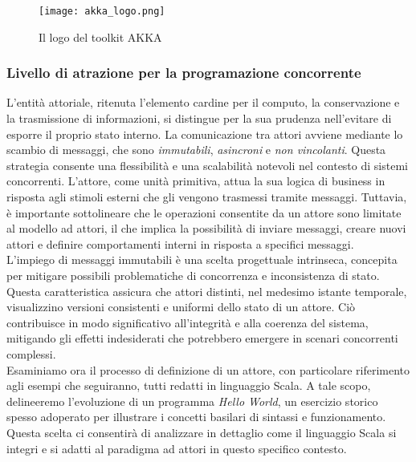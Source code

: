\begin{figure}[!ht]
  \centering
  \texttt{[image: akka\_logo.png]}
  \caption[Logo AKKA]{Il logo del toolkit AKKA \cite{akka}}
\end{figure}

\subsubsection[Programmazione concorrente]{Livello di atrazione per la programazione concorrente}
L'entità attoriale, ritenuta l'elemento cardine per il computo, la conservazione e la trasmissione di informazioni, si distingue per la sua prudenza nell'evitare di esporre il proprio stato interno.
La comunicazione tra attori avviene mediante lo scambio di messaggi, che sono \textit{immutabili}, \textit{asincroni} e \textit{non vincolanti}.
Questa strategia consente una flessibilità e una scalabilità notevoli nel contesto di sistemi concorrenti.
L'attore, come unità primitiva, attua la sua logica di business in risposta agli stimoli esterni che gli vengono trasmessi tramite messaggi.
Tuttavia, è importante sottolineare che le operazioni consentite da un attore sono limitate al modello ad attori, il che implica la possibilità di inviare messaggi, creare nuovi attori e definire comportamenti interni in risposta a specifici messaggi. \\
L'impiego di messaggi immutabili è una scelta progettuale intrinseca, concepita per mitigare possibili problematiche di concorrenza e inconsistenza di stato.
Questa caratteristica assicura che attori distinti, nel medesimo istante temporale, visualizzino versioni consistenti e uniformi dello stato di un attore.
Ciò contribuisce in modo significativo all'integrità e alla coerenza del sistema, mitigando gli effetti indesiderati che potrebbero emergere in scenari concorrenti complessi. \\
Esaminiamo ora il processo di definizione di un attore, con particolare riferimento agli esempi che seguiranno, tutti redatti in linguaggio Scala.
A tale scopo, delineeremo l'evoluzione di un programma \textit{Hello World}, un esercizio storico spesso adoperato per illustrare i concetti basilari di sintassi e funzionamento.
Questa scelta ci consentirà di analizzare in dettaglio come il linguaggio Scala si integri e si adatti al paradigma ad attori in questo specifico contesto. 

 

